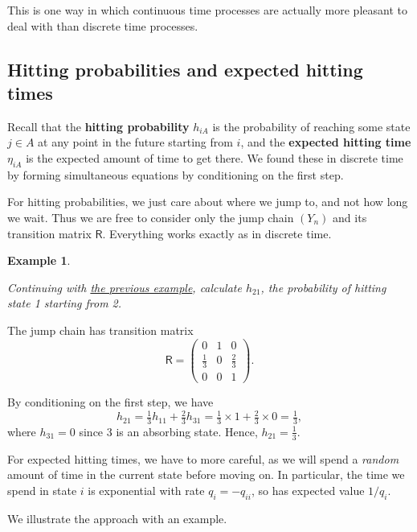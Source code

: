 \documentclass[
  a4paper,
]{article}
\theoremstyle{definition}
\theoremstyle{definition}
\newtheorem{example}{Example}[section]
\theoremstyle{definition}
\theoremstyle{remark}
\begin{document}
This is one way in which continuous time processes are actually more pleasant to deal with than discrete time processes.

\hypertarget{hitting2}{%
\subsection{Hitting probabilities and expected hitting times}\label{hitting2}}

Recall that the \textbf{hitting probability} \(h_{iA}\) is the probability of reaching some state \(j \in A\) at any point in the future starting from \(i\), and the \textbf{expected hitting time} \(\eta_{iA}\) is the expected amount of time to get there. We found these in discrete time by forming simultaneous equations by conditioning on the first step.

For hitting probabilities, we just care about where we jump to, and not how long we wait. Thus we are free to consider only the jump chain \((Y_n)\) and its transition matrix \(\mathsf R\). Everything works exactly as in discrete time.

\begin{example}
\protect\hypertarget{exm:hitting-prob-jump}{}\label{exm:hitting-prob-jump}

\emph{Continuing with \protect\hyperlink{jump-classes}{the previous example}, calculate \(h_{21}\), the probability of hitting state 1 starting from 2.}

The jump chain has transition matrix
\[ \mathsf R = \begin{pmatrix} 0 & 1 & 0 \\[0.3ex] \tfrac13 & 0 & \tfrac23 \\[0.3ex] 0 & 0 & 1 \end{pmatrix} . \]

By conditioning on the first step, we have
\[ h_{21} = \tfrac13 h_{11} + \tfrac23 h_{31} = \tfrac13 \times 1 + \tfrac23 \times 0 = \tfrac13 , \]
where \(h_{31} = 0\) since 3 is an absorbing state. Hence, \(h_{21} = \frac13\).

\end{example}

For expected hitting times, we have to more careful, as we will spend a \emph{random} amount of time in the current state before moving on. In particular, the time we spend in state \(i\) is exponential with rate \(q_i = -q_{ii}\), so has expected value \(1/q_i\).

We illustrate the approach with an example.
\end{document}
